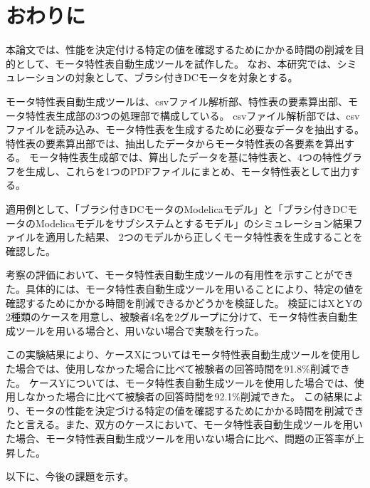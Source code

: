 \documentclass[uplatex, 10pt, a4p]{jsarticle}
\begin{document}
\section{おわりに}
本論文では、性能を決定付ける特定の値を確認するためにかかる時間の削減を目的として、モータ特性表自動生成ツールを試作した。
なお、本研究では、シミュレーションの対象として、ブラシ付きDCモータを対象とする。

モータ特性表自動生成ツールは、csvファイル解析部、特性表の要素算出部、モータ特性表生成部の3つの処理部で構成している。
csvファイル解析部では、csvファイルを読み込み、モータ特性表を生成するために必要なデータを抽出する。特性表の要素算出部では、抽出したデータからモータ特性表の各要素を算出する。
モータ特性表生成部では、算出したデータを基に特性表と、4つの特性グラフを生成し、これらを1つのPDFファイルにまとめ、モータ特性表として出力する。

適用例として、「ブラシ付きDCモータのModelicaモデル」と「ブラシ付きDCモータのModelicaモデルをサブシステムとするモデル」のシミュレーション結果ファイルを適用した結果、
2つのモデルから正しくモータ特性表を生成することを確認した。

考察の評価において、モータ特性表自動生成ツールの有用性を示すことができた。具体的には、モータ特性表自動生成ツールを用いることにより、特定の値を確認するためにかかる時間を削減できるかどうかを検証した。
検証にはXとYの2種類のケースを用意し、被験者4名を2グループに分けて、モータ特性表自動生成ツールを用いる場合と、用いない場合で実験を行った。

この実験結果により、ケースXについてはモータ特性表自動生成ツールを使用した場合では、使用しなかった場合に比べて被験者の回答時間を91.8\%削減できた。
ケースYについては、モータ特性表自動生成ツールを使用した場合では、使用しなかった場合に比べて被験者の回答時間を92.1\%削減できた。
この結果により、モータの性能を決定づける特定の値を確認するためにかかる時間を削減できたと言える。また、双方のケースにおいて、モータ特性表自動生成ツールを用いた場合、モータ特性表自動生成ツールを用いない場合に比べ、問題の正答率が上昇した。

以下に、今後の課題を示す。
\end{document}
